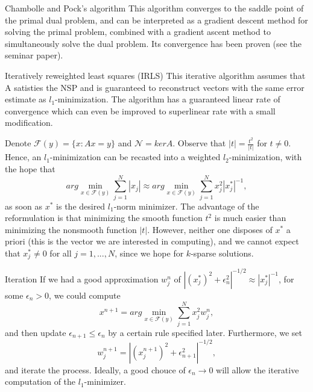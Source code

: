 \documentclass[
  english,            %
  aspectratio=169,    %
]{tumbeamer}
\begin{document}
\begin{frame}{Chambolle and Pock's algorithm}
This algorithm converges to the saddle point of the primal dual problem, and can be interpreted as a gradient descent method for solving the primal problem, combined with a gradient ascent method to simultaneously solve the dual problem. Its convergence has been proven (see the seminar paper).
\end{frame}

\begin{frame}{Iteratively reweighted least squares (IRLS)}
This iterative algorithm assumes that A satisties the NSP and is guaranteed to reconstruct vectors with the same error estimate as $l_1$-minimization. The algorithm has a guaranteed linear rate of convergence which can even be improved to superlinear rate with a small modification.

Denote $\mathcal{F}(y) = \{x : Ax = y\}$ and $\mathcal{N} = ker A$. Observe that $|t| = \frac{t^2}{|t|}$ for $t \neq 0$. Hence, an $l_1$-minimization can be recasted into a weighted $l_2$-minimization, with the hope that
\[ arg \min_{x \in \mathcal{F}(y)} \sum_{j=1}^N |x_j| \approx arg \min_{x \in \mathcal{F}(y)} \sum_{j=1}^N x_j^2 |x_j^*|^{-1} ,\]
as soon as $x^*$ is the desired $l_1$-norm minimizer. The advantage of the reformulation is that minimizing the smooth function $t^2$ is much easier than minimizing the nonsmooth function $|t|$. However, neither one disposes of $x^*$ a priori (this is the vector we are interested in computing), and we cannot expect that $x_j^* \neq 0$ for all $j = 1,...,N$, since we hope for $k$-sparse solutions.
\end{frame}

\begin{frame}{Iteration}
If we had a good approximation $w_j^n$ of $|(x_j^*)^2 + \epsilon_n^2|^{-1/2} 
\approx |x_j^*|^{-1}$, for some $\epsilon_n > 0$, we could compute
\begin{equation} \label{irls:eq1}
x^{n+1} = arg \min_{x \in \mathcal{F}(y)} \sum_{j=1}^N x_j^2 w_j^n ,
\end{equation}
and then update $\epsilon_{n+1} \leq \epsilon_{n}$ by a certain rule specified later. Furthermore, we set
\begin{equation}
\label{irls:eq2} w_j^{n+1} = |(x_j^{n+1})^2 + \epsilon_{n+1}^2|^{-1/2} ,
\end{equation}
and iterate the process. Ideally, a good chouce of $\epsilon_n \rightarrow 0$ will allow the iterative computation of the $l_1$-minimizer.
\end{frame}
\end{document}
